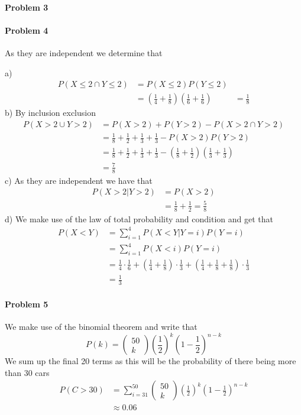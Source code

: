 \paragraph{Problem 3}
\paragraph{Problem 4}
As they are independent we determine that

a)
\begin{align*}
    P(X\leq 2\cap Y\leq 2)&=P(X\leq 2)P(Y\leq 2) \\
                 &=(\frac{1}{4}+\frac{1}{8})(\frac{1}{6}+\frac{1}{6})
                 &=\frac{1}{8}
\end{align*}
b)
By inclusion exclusion
\begin{align*}
    P(X>2\cup Y>2)&=P(X>2)+P(Y>2)-P(X>2\cap Y>2) \\
               &=\frac{1}{8}+\frac{1}{2}+\frac{1}{3}+\frac{1}{3}-P(X>2)P(Y>2) \\
               &=\frac{1}{8}+\frac{1}{2}+\frac{1}{3}+\frac{1}{3}-(\frac{1}{8}+\frac{1}{2})(\frac{1}{3}+\frac{1}{3}) \\
               &=\frac{7}{8}
\end{align*}
c)
As they are independent we have that
\begin{align*}
    P(X>2|Y>2)&=P(X>2) \\
              &=\frac{1}{8}+\frac{1}{2}=\frac{5}{8}
\end{align*}
d)
We make use of the law of total probability and condition and get that
\begin{align*}
    P(X<Y)&=\sum_{i=1}^{4}P(X<Y|Y=i)P(Y=i) \\
          &=\sum_{i=1}^{4}P(X<i)P(Y=i) \\
          &=\frac{1}{4}\cdot\frac{1}{6}+\left(\frac{1}{4}+\frac{1}{8}\right)\cdot\frac{1}{3}+\left(\frac{1}{4}+\frac{1}{8}+\frac{1}{8}\right)\cdot\frac{1}{3} \\
          &=\frac{1}{3}
\end{align*}
\paragraph{Problem 5}
We make use of the binomial theorem and write that
\[
    P(k)=\begin{pmatrix}50\\k\end{pmatrix}\left(\frac{1}{2}\right)^{k}\left(1-\frac{1}{2}\right)^{n-k}
\]
We sum up the final 20 terms as this will be the probability of there being more than 30 cars
\begin{align*}
    P(C>30)&=\sum_{i=31}^{50}\begin{pmatrix}50\\k\end{pmatrix}\left(\frac{1}{2}\right)^{k}\left(1-\frac{1}{2}\right)^{n-k} \\
           &\approx 0.06
\end{align*}
